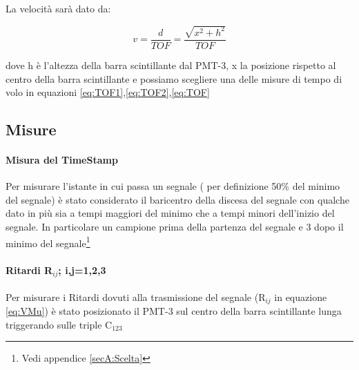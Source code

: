 \documentclass[a4paper]{article}
\begin{document}
La velocità sarà dato da:

\begin{equation}
v = \frac{d}{TOF} = \frac{\sqrt{x^2+h^2}}{TOF}
\label{eq:VMu}
\end{equation}

dove h è l'altezza della barra scintillante dal PMT-3, x la posizione rispetto al centro della barra scintillante e possiamo scegliere una delle misure di tempo di volo in equazioni \ref{eq:TOF1},\ref{eq:TOF2},\ref{eq:TOF}

\subsection{Misure}
\label{sec:MisureV}
\paragraph{Misura del TimeStamp}
Per misurare l'istante in cui passa un segnale ( per definizione 50$\%$ del minimo del segnale) è stato considerato il baricentro della discesa del segnale con qualche dato in più sia a tempi maggiori del minimo che a tempi minori dell'inizio del segnale. In particolare un campione prima della partenza del segnale e 3 dopo il minimo del segnale\footnote{Vedi appendice \ref{secA:Scelta}}

\paragraph{Ritardi R$_{ij}$; i,j=1,2,3}
Per misurare i Ritardi dovuti alla trasmissione del segnale (R$_{ij}$ in equazione \ref{eq:VMu}) è stato posizionato il PMT-3 sul centro della barra scintillante lunga triggerando sulle triple C$_{123}$
\end{document}
